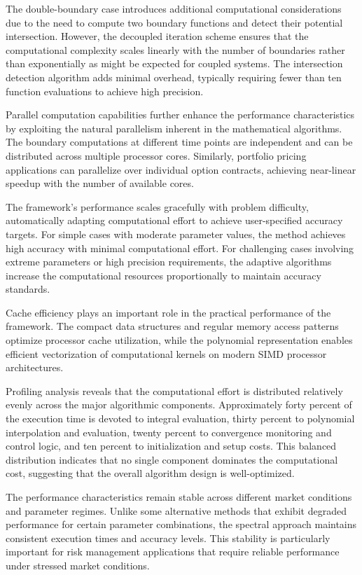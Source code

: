 \documentclass[
  american,
  11pt,
  11pt,
  letterpaper,
  onecolumn]{article}
\begin{document}
The double-boundary case introduces additional computational
considerations due to the need to compute two boundary functions and
detect their potential intersection. However, the decoupled iteration
scheme ensures that the computational complexity scales linearly with
the number of boundaries rather than exponentially as might be expected
for coupled systems. The intersection detection algorithm adds minimal
overhead, typically requiring fewer than ten function evaluations to
achieve high precision.

Parallel computation capabilities further enhance the performance
characteristics by exploiting the natural parallelism inherent in the
mathematical algorithms. The boundary computations at different time
points are independent and can be distributed across multiple processor
cores. Similarly, portfolio pricing applications can parallelize over
individual option contracts, achieving near-linear speedup with the
number of available cores.

The framework's performance scales gracefully with problem difficulty,
automatically adapting computational effort to achieve user-specified
accuracy targets. For simple cases with moderate parameter values, the
method achieves high accuracy with minimal computational effort. For
challenging cases involving extreme parameters or high precision
requirements, the adaptive algorithms increase the computational
resources proportionally to maintain accuracy standards.

Cache efficiency plays an important role in the practical performance of
the framework. The compact data structures and regular memory access
patterns optimize processor cache utilization, while the polynomial
representation enables efficient vectorization of computational kernels
on modern SIMD processor architectures.

Profiling analysis reveals that the computational effort is distributed
relatively evenly across the major algorithmic components. Approximately
forty percent of the execution time is devoted to integral evaluation,
thirty percent to polynomial interpolation and evaluation, twenty
percent to convergence monitoring and control logic, and ten percent to
initialization and setup costs. This balanced distribution indicates
that no single component dominates the computational cost, suggesting
that the overall algorithm design is well-optimized.

The performance characteristics remain stable across different market
conditions and parameter regimes. Unlike some alternative methods that
exhibit degraded performance for certain parameter combinations, the
spectral approach maintains consistent execution times and accuracy
levels. This stability is particularly important for risk management
applications that require reliable performance under stressed market
conditions.
\end{document}
